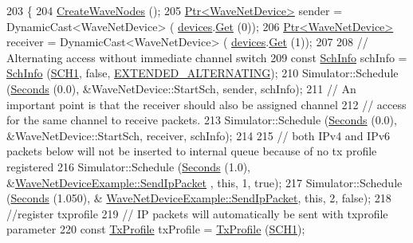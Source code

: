 \begin{DoxyCode}
203 \{
204   \hyperlink{classWaveNetDeviceExample_a825285810121c865230f6fafe6428081}{CreateWaveNodes} ();
205   \hyperlink{classns3_1_1Ptr}{Ptr<WaveNetDevice>}  sender = DynamicCast<WaveNetDevice> (
      \hyperlink{classWaveNetDeviceExample_a4b88c787809e6171c04eba282d1a1715}{devices}.\hyperlink{classns3_1_1NetDeviceContainer_a677d62594b5c9d2dea155cc5045f4d0b}{Get} (0));
206   \hyperlink{classns3_1_1Ptr}{Ptr<WaveNetDevice>}  receiver = DynamicCast<WaveNetDevice> (
      \hyperlink{classWaveNetDeviceExample_a4b88c787809e6171c04eba282d1a1715}{devices}.\hyperlink{classns3_1_1NetDeviceContainer_a677d62594b5c9d2dea155cc5045f4d0b}{Get} (1));
207 
208   \textcolor{comment}{// Alternating access without immediate channel switch}
209   \textcolor{keyword}{const} \hyperlink{structns3_1_1SchInfo}{SchInfo} schInfo = \hyperlink{structns3_1_1SchInfo}{SchInfo} (\hyperlink{channel-manager_8h_a456a1b730523e5d3b8a29fb227d10028}{SCH1}, \textcolor{keyword}{false}, 
      \hyperlink{channel-scheduler_8h_a0e1f74c3cb8f78904dd1ae957412392e}{EXTENDED\_ALTERNATING});
210   Simulator::Schedule (\hyperlink{group__timecivil_ga33c34b816f8ff6628e33d5c8e9713b9e}{Seconds} (0.0), &WaveNetDevice::StartSch, sender, schInfo);
211   \textcolor{comment}{// An important point is that the receiver should also be assigned channel}
212   \textcolor{comment}{// access for the same channel to receive packets.}
213   Simulator::Schedule (\hyperlink{group__timecivil_ga33c34b816f8ff6628e33d5c8e9713b9e}{Seconds} (0.0), &WaveNetDevice::StartSch, receiver, schInfo);
214 
215   \textcolor{comment}{// both IPv4 and IPv6 packets below will not be inserted to internal queue because of no tx profile
       registered}
216   Simulator::Schedule (\hyperlink{group__timecivil_ga33c34b816f8ff6628e33d5c8e9713b9e}{Seconds} (1.0), &\hyperlink{classWaveNetDeviceExample_a555b10fdbbaa27f47dc1f3487e1dcf0d}{WaveNetDeviceExample::SendIpPacket}
      , \textcolor{keyword}{this}, 1, \textcolor{keyword}{true});
217   Simulator::Schedule (\hyperlink{group__timecivil_ga33c34b816f8ff6628e33d5c8e9713b9e}{Seconds} (1.050), &
      \hyperlink{classWaveNetDeviceExample_a555b10fdbbaa27f47dc1f3487e1dcf0d}{WaveNetDeviceExample::SendIpPacket}, \textcolor{keyword}{this}, 2, \textcolor{keyword}{false});
218   \textcolor{comment}{//register txprofile}
219   \textcolor{comment}{// IP packets will automatically be sent with txprofile parameter}
220   \textcolor{keyword}{const} \hyperlink{structns3_1_1TxProfile}{TxProfile} txProfile = \hyperlink{structns3_1_1TxProfile}{TxProfile} (\hyperlink{channel-manager_8h_a456a1b730523e5d3b8a29fb227d10028}{SCH1});

\end{DoxyCode}

